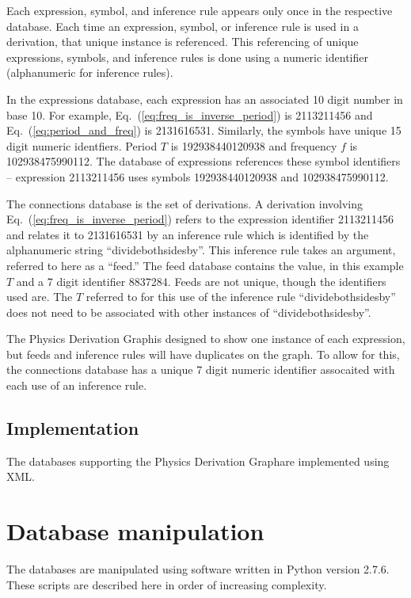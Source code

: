 \documentclass{article}
\newcommand{\eqn}[1]{Eq.\ (\ref{#1})}
\newcommand{\pdg}{Physics Derivation Graph}
\begin{document}
\begin{multicols}{2}
Each expression, symbol, and inference rule appears only once in the respective database. Each time an expression, symbol, or inference rule is used in a derivation, that unique instance is referenced. This referencing of unique expressions, symbols, and inference rules is done using a numeric identifier (alphanumeric for inference rules).

In the expressions database, each expression has an associated 10 digit number in base 10. For example, \eqn{eq:freq_is_inverse_period} is 2113211456 and \eqn{eq:period_and_freq} is 2131616531. Similarly, the symbols have unique 15 digit numeric identfiers. Period $T$ is 192938440120938 and frequency $f$ is 102938475990112. The database of expressions references these symbol identifiers -- expression 2113211456 uses symbols 192938440120938 and 102938475990112. 

The connections database is the set of derivations. A derivation involving \eqn{eq:freq_is_inverse_period} refers to the expression identifier 2113211456 and relates it to 2131616531 by an inference rule which is identified by the alphanumeric string ``dividebothsidesby''. This inference rule takes an argument, referred to here as a ``feed.'' The feed database contains the value, in this example $T$ and a 7 digit identifier 8837284. Feeds are not unique, though the identifiers used are. The $T$ referred to for this use of the inference rule ``dividebothsidesby'' does not need to be associated with other instances of ``dividebothsidesby''. 

The \pdg is designed to show one instance of each expression, but feeds and inference rules will have duplicates on the graph. To allow for this, the connections database has a unique 7 digit numeric identifier assocaited with each use of an inference rule. 

\subsection{Implementation\label{sec:implementation}}
The databases supporting the \pdg are implemented using XML\cite{2008_XML}. 

\section{Database manipulation}

The databases are manipulated using software written in Python\cite{2015_Python} version 2.7.6. These scripts are described here in order of increasing complexity. 


\end{multicols}
\end{document}
